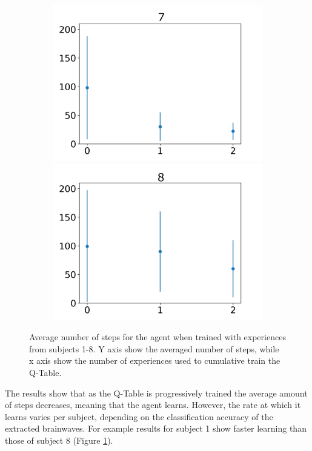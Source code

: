 \documentclass[journal]{IEEEtran}
\begin{document}
{{\begin{figure}[h!]
\begin{subfigure}{0.5\textwidth}
  \centering
  \includegraphics[scale=0.27]{Images/Average_steps/g.png} 
  \includegraphics[scale=0.27]{Images/Average_steps/h.png} 
\end{subfigure}
\caption{Average number of steps for the agent when trained with experiences from subjects 1-8. Y axis show the averaged number of steps, while x axis show the number of experiences used to cumulative train the Q-Table.}
\label{fig:avg_steps}
\end{figure}


The results show that as the Q-Table is progressively trained the average amount of steps decreases, meaning that the agent learns. However, the rate at which it learns varies per subject, depending on the classification accuracy of the extracted brainwaves.  For example results for subject 1 show faster learning than those of subject 8 (Figure \ref{fig:avg_steps}).

}}
\end{document}
